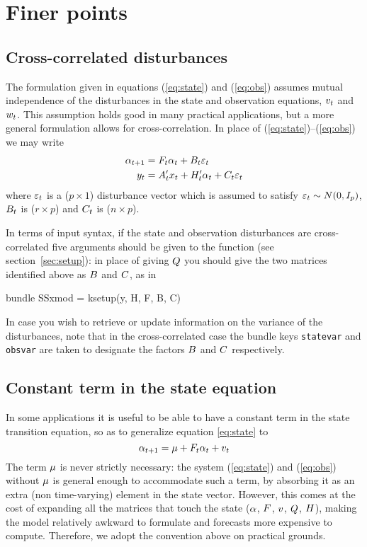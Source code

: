 \documentclass[a4paper]{article}
\begin{document}
\section{Finer points}
\label{sec:finer}

\subsection{Cross-correlated disturbances}
\label{sec:crossd}

The formulation given in equations (\ref{eq:state}) and (\ref{eq:obs})
assumes mutual independence of the disturbances in the state and
observation equations, $v_t$ and $w_t$.  This assumption
holds good in many practical applications, but a more general
formulation allows for cross-correlation.  In place of
(\ref{eq:state})--(\ref{eq:obs}) we may write
%
\begin{align*}
  \alpha_{t+1} &= F_t \alpha_t + 
     B_t \varepsilon_t \\
  y_t &= A_t'x_t + H_t' \alpha_t + 
     C_t \varepsilon_t 
\end{align*}
%
where $\varepsilon_t$ is a ($p \times 1$) disturbance vector which is
assumed to satisfy $\varepsilon_t \sim N(0, I_p)$, $B_t$ is
($r \times p$) and $C_t$ is ($n \times p$).

In terms of input syntax, if the state and observation disturbances
are cross-correlated five arguments should be given to the
 function (see section~\ref{sec:setup}): in place of
giving $Q$ you should give the two matrices identified above as
$B$ and $C$, as in
\begin{code}
bundle SSxmod = ksetup(y, H, F, B, C)
\end{code}

In case you wish to retrieve or update information on the variance of
the disturbances, note that in the cross-correlated case the bundle
keys \texttt{statevar} and \texttt{obsvar} are taken to designate the
factors $B$ and $C$ respectively.

\subsection{Constant term in the state equation}
\label{sec:stconst}

In some applications it is useful to be able to have a
constant term in the state transition equation, so as to generalize
equation \eqref{eq:state} to 
\[
  \alpha_{t+1} = \mu + F_t \alpha_t + v_t \\
\]
The term $\mu$ is never strictly necessary: the system
(\ref{eq:state}) and (\ref{eq:obs}) without $\mu$ is general
enough to accommodate such a term, by absorbing it as an extra (non
time-varying) element in the state vector.  However, this comes at the
cost of expanding all the matrices that touch the state ($\alpha$,
$F$, $v$, $Q$, $H$), making the model
relatively awkward to formulate and forecasts more expensive to
compute. Therefore, we adopt the convention above on practical
grounds.
\end{document}
